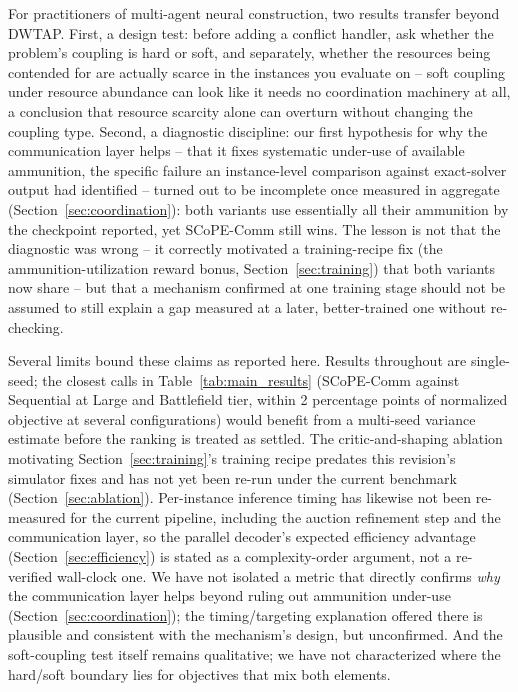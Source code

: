For practitioners of multi-agent neural construction, two results transfer beyond DWTAP. First, a design test: before adding a conflict handler, ask whether the problem's coupling is hard or soft, and separately, whether the resources being contended for are actually scarce in the instances you evaluate on -- soft coupling under resource abundance can look like it needs no coordination machinery at all, a conclusion that resource scarcity alone can overturn without changing the coupling type. Second, a diagnostic discipline: our first hypothesis for why the communication layer helps -- that it fixes systematic under-use of available ammunition, the specific failure an instance-level comparison against exact-solver output had identified -- turned out to be incomplete once measured in aggregate (Section~\ref{sec:coordination}): both variants use essentially all their ammunition by the checkpoint reported, yet SCoPE-Comm still wins. The lesson is not that the diagnostic was wrong -- it correctly motivated a training-recipe fix (the ammunition-utilization reward bonus, Section~\ref{sec:training}) that both variants now share -- but that a mechanism confirmed at one training stage should not be assumed to still explain a gap measured at a later, better-trained one without re-checking.

Several limits bound these claims as reported here. Results throughout are single-seed; the closest calls in Table~\ref{tab:main_results} (SCoPE-Comm against Sequential at Large and Battlefield tier, within 2 percentage points of normalized objective at several configurations) would benefit from a multi-seed variance estimate before the ranking is treated as settled. The critic-and-shaping ablation motivating Section~\ref{sec:training}'s training recipe predates this revision's simulator fixes and has not yet been re-run under the current benchmark (Section~\ref{sec:ablation}). Per-instance inference timing has likewise not been re-measured for the current pipeline, including the auction refinement step and the communication layer, so the parallel decoder's expected efficiency advantage (Section~\ref{sec:efficiency}) is stated as a complexity-order argument, not a re-verified wall-clock one. We have not isolated a metric that directly confirms \emph{why} the communication layer helps beyond ruling out ammunition under-use (Section~\ref{sec:coordination}); the timing/targeting explanation offered there is plausible and consistent with the mechanism's design, but unconfirmed. And the soft-coupling test itself remains qualitative; we have not characterized where the hard/soft boundary lies for objectives that mix both elements.

